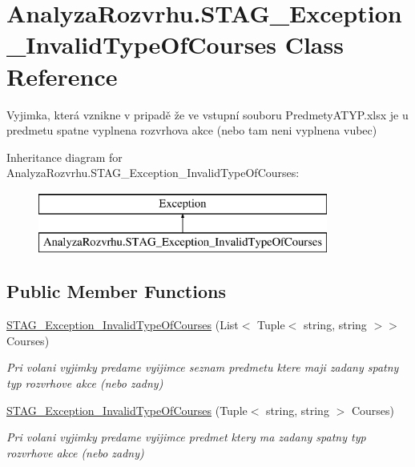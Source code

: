 \hypertarget{class_analyza_rozvrhu_1_1_s_t_a_g___exception___invalid_type_of_courses}{}\section{Analyza\+Rozvrhu.\+S\+T\+A\+G\+\_\+\+Exception\+\_\+\+Invalid\+Type\+Of\+Courses Class Reference}
\label{class_analyza_rozvrhu_1_1_s_t_a_g___exception___invalid_type_of_courses}


Vyjimka, která vznikne v pripadě že ve vstupní souboru Predmety\+A\+T\+Y\+P.\+xlsx je u predmetu spatne vyplnena rozvrhova akce (nebo tam neni vyplnena vubec)  


Inheritance diagram for Analyza\+Rozvrhu.\+S\+T\+A\+G\+\_\+\+Exception\+\_\+\+Invalid\+Type\+Of\+Courses\+:\begin{figure}[H]
\begin{center}
\leavevmode
\includegraphics[height=2.000000cm]{class_analyza_rozvrhu_1_1_s_t_a_g___exception___invalid_type_of_courses}
\end{center}
\end{figure}
\subsection*{Public Member Functions}
\begin{DoxyCompactItemize}
\item 
\hyperlink{class_analyza_rozvrhu_1_1_s_t_a_g___exception___invalid_type_of_courses_ae00012c0be919cf8d2555b285807b8de}{S\+T\+A\+G\+\_\+\+Exception\+\_\+\+Invalid\+Type\+Of\+Courses} (List$<$ Tuple$<$ string, string $>$$>$ Courses)
\begin{DoxyCompactList}\small\item\em Pri volani vyjimky predame vyijimce seznam predmetu ktere maji zadany spatny typ rozvrhove akce (nebo zadny) \end{DoxyCompactList}\item 
\hyperlink{class_analyza_rozvrhu_1_1_s_t_a_g___exception___invalid_type_of_courses_aa50a18e4e4c24d67e8ee8d36809e4b41}{S\+T\+A\+G\+\_\+\+Exception\+\_\+\+Invalid\+Type\+Of\+Courses} (Tuple$<$ string, string $>$ Courses)
\begin{DoxyCompactList}\small\item\em Pri volani vyjimky predame vyijimce predmet ktery ma zadany spatny typ rozvrhove akce (nebo zadny) \end{DoxyCompactList}\end{DoxyCompactItemize}


